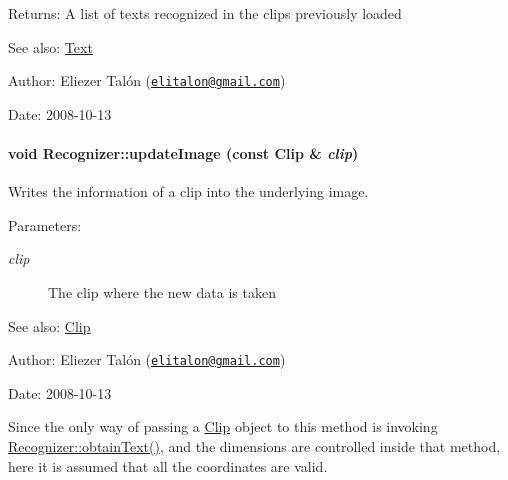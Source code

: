 \begin{Desc}
\item[Returns:]A list of texts recognized in the clips previously loaded\end{Desc}
\begin{Desc}
\item[See also:]\hyperlink{class_text}{Text}\end{Desc}
\begin{Desc}
\item[Author:]Eliezer Talón (\href{mailto:elitalon@gmail.com}{\tt elitalon@gmail.com}) \end{Desc}
\begin{Desc}
\item[Date:]2008-10-13 \end{Desc}
\hypertarget{class_recognizer_0779d8bb035f7d51cb26fdc3d410e019}{
\paragraph[{updateImage}]{\setlength{\rightskip}{0pt plus 5cm}void Recognizer::updateImage (const {\bf Clip} \& {\em clip})}\hfill}
\label{class_recognizer_0779d8bb035f7d51cb26fdc3d410e019}


Writes the information of a clip into the underlying image. 

\begin{Desc}
\item[Parameters:]
\begin{description}
\item[{\em clip}]The clip where the new data is taken\end{description}
\end{Desc}
\begin{Desc}
\item[See also:]\hyperlink{class_clip}{Clip}\end{Desc}
\begin{Desc}
\item[Author:]Eliezer Talón (\href{mailto:elitalon@gmail.com}{\tt elitalon@gmail.com}) \end{Desc}
\begin{Desc}
\item[Date:]2008-10-13\end{Desc}
Since the only way of passing a \hyperlink{class_clip}{Clip} object to this method is invoking \hyperlink{class_recognizer_008a0ea69a912ff54882dd20d18adcf9}{Recognizer::obtainText()}, and the dimensions are controlled inside that method, here it is assumed that all the coordinates are valid. 

